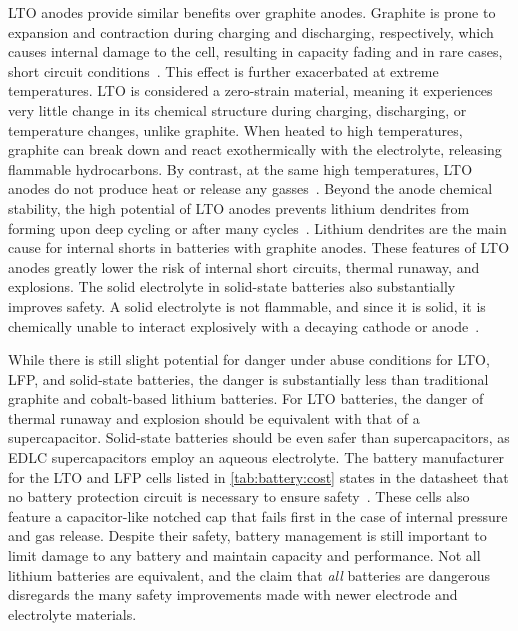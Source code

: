 LTO anodes provide similar benefits over graphite anodes. Graphite is prone to expansion and contraction during charging and discharging, respectively, which causes internal damage to the cell, resulting in capacity fading and in rare cases, short circuit conditions~\cite{sandhya2014lithium}. This effect is further exacerbated at extreme temperatures. 
LTO is considered a zero-strain material, meaning it experiences very little change in its chemical structure during charging, discharging, or temperature changes, unlike graphite. When heated to high temperatures, graphite can break down and react exothermically with the electrolyte, releasing flammable hydrocarbons. By contrast, at the same high temperatures, LTO anodes do not produce heat or release any gasses~\cite{belharouakElectrochemistry11}. Beyond the anode chemical stability, the high potential of LTO anodes prevents lithium dendrites from forming upon deep cycling or after many cycles~\cite{nitta2015li}. Lithium dendrites are the main cause for internal shorts in batteries with graphite anodes. These features of LTO anodes greatly lower the risk of internal short circuits, thermal runaway, and explosions.
The solid electrolyte in solid-state batteries also substantially improves safety. A solid electrolyte is not flammable, and since it is solid, it is chemically unable to interact explosively with a decaying cathode or anode~\cite{kim2015review}.

While there is still slight potential for danger under abuse conditions for LTO, LFP, and solid-state batteries, the danger is substantially less than traditional graphite and cobalt-based lithium batteries. For LTO batteries, the danger of thermal runaway and explosion should be equivalent with that of a supercapacitor. Solid-state batteries should be even safer than supercapacitors, as EDLC supercapacitors employ an aqueous electrolyte.
The battery manufacturer for the LTO and LFP cells listed in \cref{tab:battery:cost} states in the datasheet that no battery protection circuit is necessary to ensure safety~\cite{LTODatasheet,LTODatasheet2}. 
These cells also feature a capacitor-like notched cap that fails first in the case of internal pressure and gas release.
Despite their safety, battery management is still important to limit damage to any battery and maintain capacity and performance. 
Not all lithium batteries are equivalent, and the claim that \textit{all} batteries are dangerous disregards the many safety improvements made with newer electrode and electrolyte materials.

